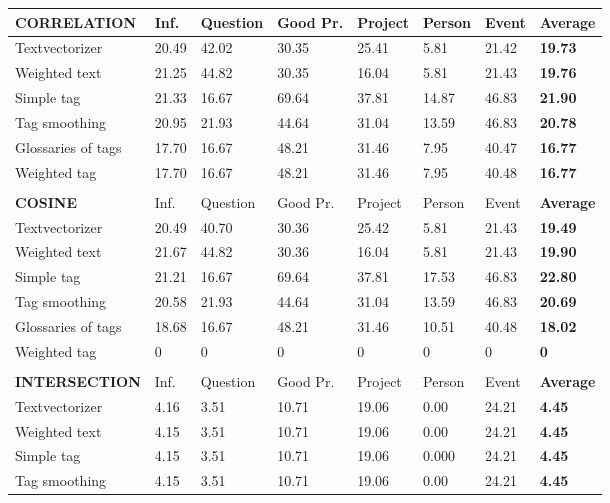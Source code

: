\begin{table}

\begin{tabular}{| l | l | l | l | l | l | l | l |}
\hline
{\bf CORRELATION} & Inf. &  Question &  Good Pr.& Project & Person &  Event & {\bf Average} \\
\hline
Textvectorizer & 20.49 & 42.02 & 30.35 & 25.41 & 5.81 & 21.42 & {\bf 19.73} \\ 
Weighted text & 21.25 & 44.82 & 30.35 & 16.04 & 5.81 & 21.43 & {\bf 19.76} \\ 
Simple tag & 21.33 & 16.67 & 69.64 & 37.81 & 14.87 & 46.83 & {\bf 21.90} \\ 
Tag smoothing & 20.95 & 21.93 & 44.64 & 31.04 & 13.59 & 46.83 & {\bf 20.78} \\ 
Glossaries of tags & 17.70 & 16.67 & 48.21 & 31.46 & 7.95 & 40.47 & {\bf 16.77} \\ 
Weighted tag & 17.70 & 16.67 & 48.21 & 31.46 & 7.95 & 40.48 & {\bf 16.77} \\ 
\hline
\\
\hline
{\bf COSINE} & Inf. &  Question &  Good Pr.& Project & Person &  Event & {\bf Average} \\
\hline
Textvectorizer & 20.49 & 40.70 & 30.36 & 25.42 & 5.81 & 21.43 & {\bf 19.49} \\ 
Weighted text & 21.67 & 44.82 & 30.36 & 16.04 & 5.81 & 21.43 & {\bf 19.90} \\ 
Simple tag & 21.21 & 16.67 & 69.64 & 37.81 & 17.53 & 46.83 & {\bf 22.80 } \\ 
Tag smoothing & 20.58 & 21.93 & 44.64 & 31.04 & 13.59 & 46.83 & {\bf 20.69} \\ 
Glossaries of tags & 18.68 & 16.67 & 48.21 & 31.46 & 10.51 & 40.48 & {\bf 18.02} \\ 
Weighted tag & 0 & 0 & 0 & 0 & 0 & 0 & {\bf 0} \\ 
\hline
\\
\hline
{\bf INTERSECTION} & Inf. &  Question &  Good Pr.& Project & Person &  Event & {\bf Average} \\
\hline
Textvectorizer & 4.16 & 3.51 & 10.71 & 19.06 & 0.00 & 24.21 & {\bf 4.45} \\ 
Weighted text & 4.15 & 3.51 & 10.71 & 19.06 & 0.00 & 24.21 & {\bf 4.45} \\ 
Simple tag & 4.15 & 3.51 & 10.71 & 19.06 & 0.000 & 24.21 & {\bf 4.45} \\ 
Tag smoothing & 4.15 & 3.51 & 10.71 & 19.06 & 0.00 & 24.21 & {\bf 4.45} \\ 

\end{tabular}
\end{table}
